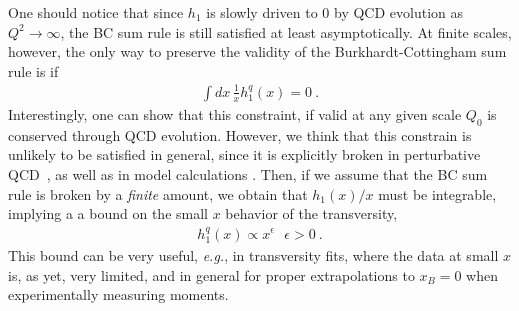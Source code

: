 \documentclass[preprintnumbers,floatfix,nofootinbib]{revtex4}
\newcommand{\eg}{{\em e.g.}}
\begin{document}
One should notice that since $h_1$ is slowly driven to 0 by QCD evolution as $Q^2 \to \infty$, the BC sum rule is still satisfied at least
asymptotically.
At finite scales, however, the only way to preserve the validity of the
Burkhardt-Cottingham sum rule is if
\begin{align}
   \int dx\, \frac{1}{x} h_1^q(x) = 0 \ .
\label{eq:ABsumrule}
\end{align}
Interestingly, one can show that this constraint, if valid at any given scale
$Q_0$ is conserved through QCD evolution. However, we think that this
constrain is unlikely to be satisfied in general, since it is explicitly broken in perturbative
QCD~\cite{Kundu:2001pk}, as well as in model calculations \cite{Schweitzer:2001sr,Wakamatsu:2007nc,Pasquini:2005dk,Cloet:2007em,Bacchetta:2008af,Bourrely:2010ng}. Then, if we assume that the BC sum rule is broken by a {\em finite} amount, we obtain that $h_1(x)/x$ must be integrable, implying a 
a bound on the small $x$ behavior of the transversity, 
\begin{align}
  h_1^q(x) \propto x^\epsilon \ \ \ \epsilon>0 \ .
\label{eq:ABbound}
\end{align}
This bound can be very useful, \eg, in transversity fits, where the data at
small $x$ is, as yet, very limited, and in general for proper extrapolations
to $x_B=0$ when experimentally measuring moments. 
\end{document}

